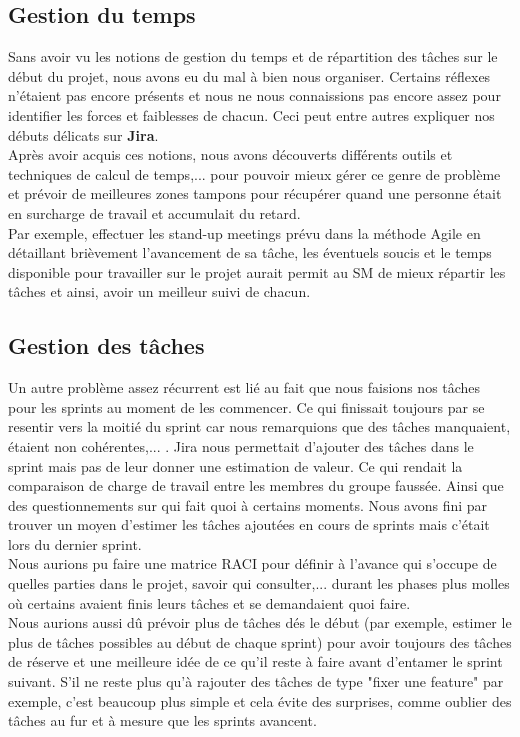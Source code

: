 \documentclass[t, 12pt, usenames,dvipsnames]{article}
\begin{document}
     \subsection{Gestion du temps}
     \noindent Sans avoir vu les notions de gestion du temps et de répartition des tâches sur le début du projet, nous avons eu du mal à bien nous organiser. Certains réflexes n'étaient pas encore présents et nous ne nous connaissions pas encore assez pour identifier les forces et faiblesses de chacun. Ceci peut entre autres expliquer nos débuts délicats sur \textbf{Jira}. \\
     Après avoir acquis ces notions, nous avons découverts différents outils et techniques de calcul de temps,... pour pouvoir mieux gérer ce genre de problème et prévoir de meilleures zones tampons pour récupérer quand une personne était en surcharge de travail et accumulait du retard.
     \\Par exemple, effectuer les stand-up meetings prévu dans la méthode Agile en détaillant brièvement l'avancement de sa tâche, les éventuels soucis et le temps disponible pour travailler sur le projet aurait permit au SM de mieux répartir les tâches et ainsi, avoir un meilleur suivi de chacun.
     
     \subsection{Gestion des tâches}
     \noindent Un autre problème assez récurrent est lié au fait que nous faisions nos tâches pour les sprints au moment de les commencer. Ce qui finissait toujours par se resentir vers la moitié du sprint car nous remarquions que des tâches manquaient, étaient non cohérentes,... . Jira nous permettait d'ajouter des tâches dans le sprint mais pas de leur donner une estimation de valeur. Ce qui rendait la comparaison de charge de travail entre les membres du groupe faussée. Ainsi que des questionnements sur qui fait quoi à certains moments. Nous avons fini par trouver un moyen d'estimer les tâches ajoutées en cours de sprints mais c'était lors du dernier sprint.
     \\ Nous aurions pu faire une matrice RACI pour définir à l'avance qui s'occupe de quelles parties dans le projet, savoir qui consulter,... durant les phases plus molles où certains avaient finis leurs tâches et se demandaient quoi faire. \\
     Nous aurions aussi dû prévoir plus de tâches dés le début (par exemple, estimer le plus de tâches possibles au début de chaque sprint) pour avoir toujours des tâches de réserve et une meilleure idée de ce qu'il reste à faire avant d'entamer le sprint suivant. S'il ne reste plus qu'à rajouter des tâches de type "fixer une feature" par exemple, c'est beaucoup plus simple et cela évite des surprises, comme oublier des tâches au fur et à mesure que les sprints avancent.
     
\end{document}

